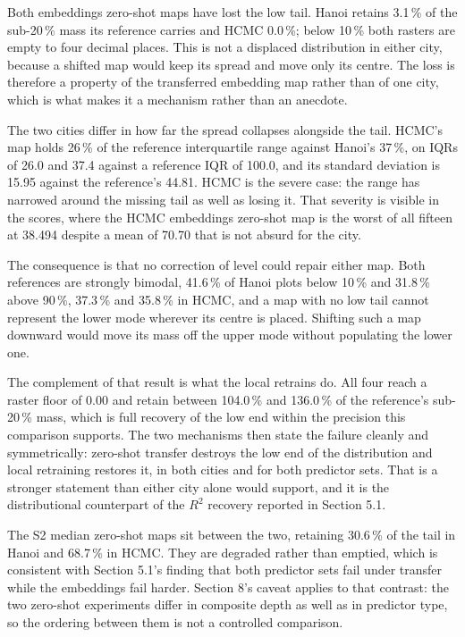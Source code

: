\documentclass[11pt,a4paper]{article}
\newcommand{\Rsq}{$R^2$}
\begin{document}
Both embeddings zero-shot maps have lost the low tail. Hanoi retains 3.1\,\% of the
sub-20\,\% mass its reference carries and HCMC 0.0\,\%; below 10\,\% both rasters are
empty to four decimal places. This is not a displaced distribution in either
city, because a shifted map would keep its spread and move only its centre. The
loss is therefore a property of the transferred embedding map rather than of one
city, which is what makes it a mechanism rather than an anecdote.

The two cities differ in how far the spread collapses alongside the tail. HCMC's
map holds 26\,\% of the reference interquartile range against Hanoi's 37\,\%, on
IQRs of 26.0 and 37.4 against a reference IQR of 100.0, and its standard
deviation is 15.95 against the reference's 44.81. HCMC is the severe case: the
range has narrowed around the missing tail as well as losing it. That severity is
visible in the scores, where the HCMC embeddings zero-shot map is the worst of all
fifteen at 38.494 despite a mean of 70.70 that is not absurd for the city.

The consequence is that no correction of level could repair either map. Both
references are strongly bimodal, 41.6\,\% of Hanoi plots below 10\,\% and 31.8\,\%
above 90\,\%, 37.3\,\% and 35.8\,\% in HCMC, and a map with no low tail cannot
represent the lower mode wherever its centre is placed. Shifting such a map
downward would move its mass off the upper mode without populating the lower one.

The complement of that result is what the local retrains do. All four reach a
raster floor of 0.00 and retain between 104.0\,\% and 136.0\,\% of the reference's
sub-20\,\% mass, which is full recovery of the low end within the precision this
comparison supports. The two mechanisms then state the failure cleanly and
symmetrically: zero-shot transfer destroys the low end of the distribution and
local retraining restores it, in both cities and for both predictor sets. That is
a stronger statement than either city alone would support, and it is the
distributional counterpart of the \Rsq{} recovery reported in Section 5.1.

The S2 median zero-shot maps sit between the two, retaining 30.6\,\% of the tail in
Hanoi and 68.7\,\% in HCMC. They are degraded rather than emptied, which is
consistent with Section 5.1's finding that both predictor sets fail under transfer
while the embeddings fail harder. Section 8's caveat applies to that contrast: the
two zero-shot experiments differ in composite depth as well as in predictor type,
so the ordering between them is not a controlled comparison.
\end{document}
